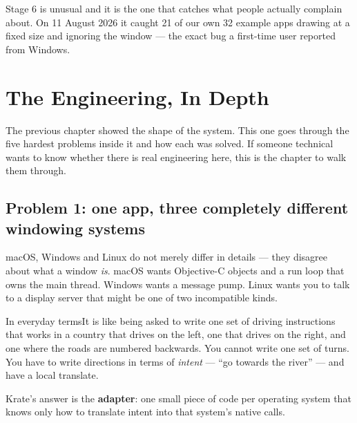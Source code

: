 \documentclass[11pt,a4paper]{report}
\newcommand{\analogy}[1]{\begin{plainbox}{In everyday terms}#1\end{plainbox}}
\begin{document}
Stage 6 is unusual and it is the one that catches what people actually
complain about. On 11 August 2026 it caught 21 of our own 32 example apps
drawing at a fixed size and ignoring the window --- the exact bug a
first-time user reported from Windows.

\chapter{The Engineering, In Depth}

The previous chapter showed the shape of the system. This one goes through
the five hardest problems inside it and how each was solved. If someone
technical wants to know whether there is real engineering here, this is the
chapter to walk them through.

\section{Problem 1: one app, three completely different windowing systems}

macOS, Windows and Linux do not merely differ in details --- they disagree
about what a window \emph{is}. macOS wants Objective-C objects and a run
loop that owns the main thread. Windows wants a message pump. Linux wants
you to talk to a display server that might be one of two incompatible
kinds.

\analogy{It is like being asked to write one set of driving instructions
that works in a country that drives on the left, one that drives on the
right, and one where the roads are numbered backwards. You cannot write one
set of turns. You have to write directions in terms of \emph{intent} ---
``go towards the river'' --- and have a local translate.}

Krate's answer is the \textbf{adapter}: one small piece of code per
operating system that knows only how to translate intent into that system's
native calls.

\begin{center}
\end{center}
\end{document}
